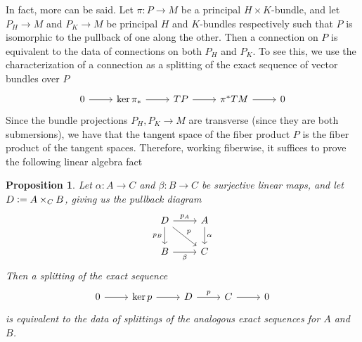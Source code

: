 \documentclass[psamsfonts, 12pt]{amsart}
\newtheorem{prop}[thm]{Proposition}
\theoremstyle{definition}
\theoremstyle{remark}
\newcommand{\defeq}{\vcentcolon=}
\begin{document}
In fact, more can be said. Let $\pi : P \to M$ be a principal $H\times K$-bundle, and
let $P_H\to M$ and $P_K \to M$ be principal $H$ and $K$-bundles respectively such
that $P$ is isomorphic to the pullback of one along the other. Then a connection
on $P$ is equivalent to the data of connections on both $P_H$ and $P_K$. To see
this, we use the characterization of a connection as a splitting of the
exact sequence of vector bundles over $P$
\[\begin{tikzcd}
0 \ar[r] & \ker\pi_* \ar[r] & TP \ar[r] & \pi^*TM \ar[r] & 0
\end{tikzcd}\]
Since the bundle projections $P_H,P_K \to M$ are transverse (since they are both
submersions), we have that the tangent space of the fiber product
$P$ is the fiber product of the tangent spaces. Therefore, working fiberwise,
it suffices to prove the following linear algebra fact
%
\begin{prop}
Let $\alpha : A \to C$ and $\beta : B \to C$ be surjective linear maps, and
let $D \defeq A \times_C B$, giving us the pullback diagram
\[\begin{tikzcd}
D \ar[r, "p_A"] \ar[d, "p_B"'] \ar[dr, "p"] & A \ar[d,"\alpha"]\\
B \ar[r, "\beta"'] & C
\end{tikzcd}\]
Then a splitting of the exact sequence
\[\begin{tikzcd}
0 \ar[r] & \ker p \ar[r] & D \ar[r, "p"] & C \ar[r] & 0
\end{tikzcd}\]
is equivalent to the data of splittings of the analogous exact sequences for
$A$ and $B$.
\end{prop}
%
\end{document}
